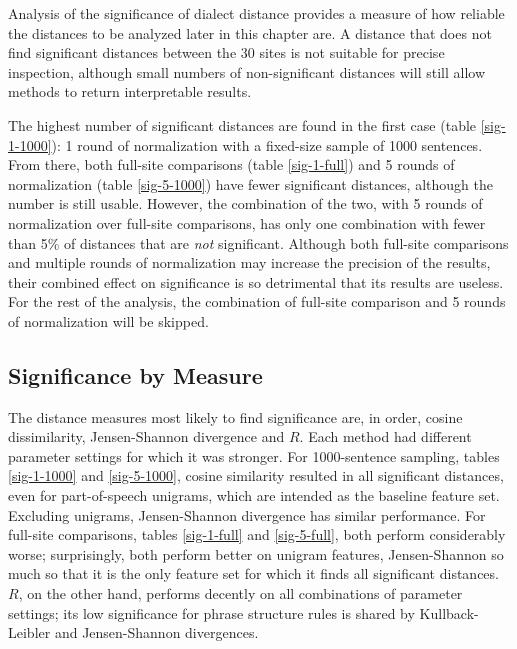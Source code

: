 Analysis of the significance of dialect distance provides a measure of
how reliable the distances to be analyzed later in this chapter are. A
distance that does not find significant distances between the 30
sites is not suitable for precise inspection, although small numbers
of non-significant distances will still allow methods to
return interpretable results.

The highest number of significant distances are found in the first
case (table \ref{sig-1-1000}): 1 round of normalization with a
fixed-size sample of 1000 sentences. From there, both full-site
comparisons (table \ref{sig-1-full}) and 5 rounds of normalization
(table \ref{sig-5-1000}) have fewer significant distances, although
the number is still usable. However, the combination of the two, with
5 rounds of normalization over full-site comparisons, has only one
combination with fewer than 5\% of distances that are {\it not}
significant. Although both full-site comparisons and multiple rounds
of normalization may increase the precision of the results, their
combined effect on significance is so detrimental that its results are
useless. For the rest of the analysis, the combination of full-site
comparison and 5 rounds of normalization will be skipped.

\subsection{Significance by Measure}

The distance measures most likely to find significance are, in order,
cosine dissimilarity, Jensen-Shannon divergence and $R$. Each method
had different parameter settings for which it was stronger. For
1000-sentence sampling, tables \ref{sig-1-1000} and \ref{sig-5-1000},
cosine similarity resulted in all significant distances, even for
part-of-speech unigrams, which are intended as the baseline feature
set. Excluding unigrams, Jensen-Shannon divergence has similar
performance. For full-site comparisons, tables \ref{sig-1-full} and
\ref{sig-5-full}, both perform considerably worse; surprisingly, both
perform better on unigram features, Jensen-Shannon so much so that it
is the only feature set for which it finds all significant
distances. $R$, on the other hand, performs decently on all
combinations of parameter settings; its low significance for phrase
structure rules is shared by Kullback-Leibler and Jensen-Shannon
divergences.

